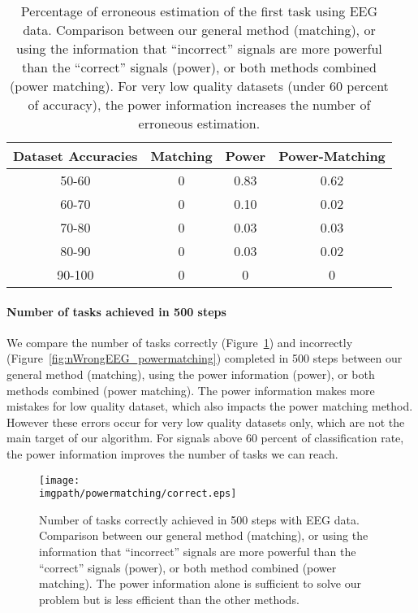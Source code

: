 \begin{table}
\centering
{}
\begin{tabular}{c c c c}
    Dataset Accuracies & Matching & Power & Power-Matching \\ \hline
    50-60 & 0 & 0.83 & 0.62 \\ 
    60-70 & 0 & 0.10 & 0.02 \\
    70-80 & 0 & 0.03 & 0.03 \\
    80-90 & 0 & 0.03 & 0.02 \\
    90-100 & 0 & 0 & 0 \\
\end{tabular}
\caption{Percentage of erroneous estimation of the first task using EEG data. Comparison between our general method (matching), or using the information that ``incorrect'' signals are more powerful than the ``correct'' signals (power), or both methods combined (power matching). For very low quality datasets (under 60 percent of accuracy), the power information increases the number of erroneous estimation.}
\label{tab:errorTaskRatio}
\end{table}


\paragraph{Number of tasks achieved in 500 steps}

We compare the number of tasks correctly (Figure~\ref{fig:nCorrect_powermatching}) and incorrectly (Figure~\ref{fig:nWrongEEG_powermatching}) completed in 500 steps between our general method (matching), using the power information (power), or both methods combined (power matching). The power information makes more mistakes for low quality dataset, which also impacts the power matching method. However these errors occur for very low quality datasets only, which are not the main target of our algorithm. For signals above 60 percent of classification rate, the power information improves the number of tasks we can reach. 

\begin{figure}[!htbp]
\centering
\texttt{[image: \\imgpath/powermatching/correct.eps]}
\caption{Number of tasks correctly achieved in 500 steps with EEG data. Comparison between our general method (matching), or using the information that ``incorrect'' signals are more powerful than the ``correct'' signals (power), or both method combined (power matching). The power information alone is sufficient to solve our problem but is less efficient than the other methods.}
\label{fig:nCorrect_powermatching}
\end{figure} 

